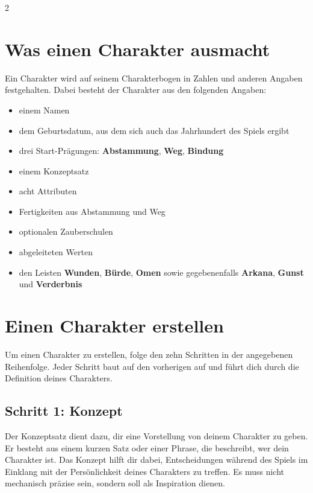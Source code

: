 \label{ch:charaktere}

\begin{multicols*}{2}
\section{Was einen Charakter ausmacht}\label{sec:was-einen-charakter-ausmacht2}

Ein Charakter wird auf seinem Charakterbogen in Zahlen und anderen Angaben festgehalten.
Dabei besteht der Charakter aus den folgenden Angaben:

\begin{itemize}[leftmargin=*]
    \item einem Namen
    \item dem Geburtsdatum, aus dem sich auch das Jahrhundert des Spiels ergibt
    \item drei Start-Prägungen: \textbf{Abstammung}, \textbf{Weg}, \textbf{Bindung}
    \item einem Konzeptsatz
    \item acht Attributen
    \item Fertigkeiten aus Abstammung und Weg
    \item optionalen Zauberschulen
    \item abgeleiteten Werten
    \item den Leisten \textbf{Wunden}, \textbf{Bürde}, \textbf{Omen} sowie gegebenenfalls \textbf{Arkana}, \textbf{Gunst} und \textbf{Verderbnis}
\end{itemize}

\section{Einen Charakter erstellen}\label{sec:einen-charakter-erstellen}

Um einen Charakter zu erstellen, folge den zehn Schritten in der angegebenen Reihenfolge.
Jeder Schritt baut auf den vorherigen auf und führt dich durch die Definition deines Charakters.

\subsection{Schritt 1: Konzept}\label{subsec:schritt-1:-konzept}

Der Konzeptsatz dient dazu, dir eine Vorstellung von deinem Charakter zu geben.
Er besteht aus einem kurzen Satz oder einer Phrase, die beschreibt, wer dein Charakter ist.
Das Konzept hilft dir dabei, Entscheidungen während des Spiels im Einklang mit der Persönlichkeit deines Charakters zu treffen.
Es muss nicht mechanisch präzise sein, sondern soll als Inspiration dienen.


\end{multicols*}
